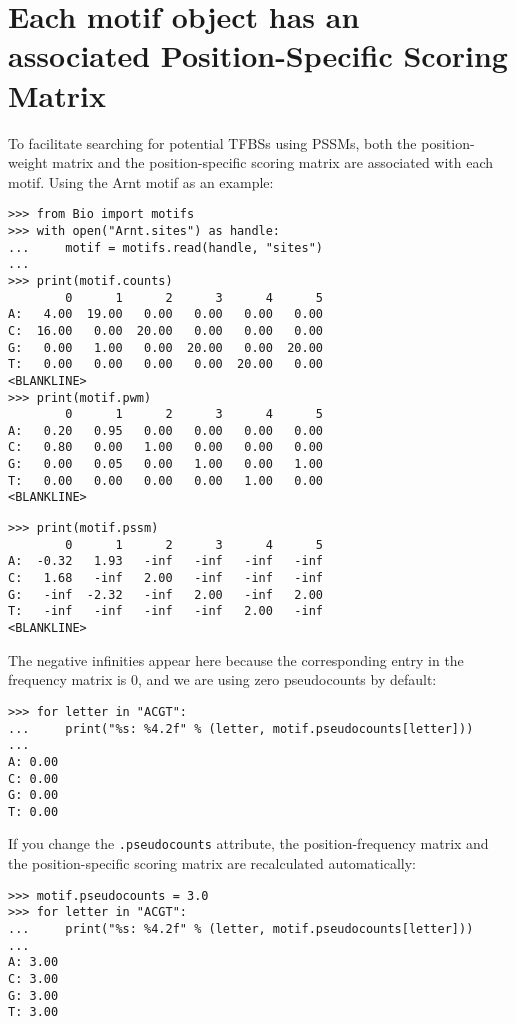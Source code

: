 \section{Each motif object has an associated Position-Specific Scoring Matrix}

To facilitate searching for potential TFBSs using PSSMs, both the position-weight matrix and the position-specific scoring matrix are associated with each motif. Using the Arnt motif as an example:
\begin{verbatim}
>>> from Bio import motifs
>>> with open("Arnt.sites") as handle:
...     motif = motifs.read(handle, "sites")
...
>>> print(motif.counts)
        0      1      2      3      4      5
A:   4.00  19.00   0.00   0.00   0.00   0.00
C:  16.00   0.00  20.00   0.00   0.00   0.00
G:   0.00   1.00   0.00  20.00   0.00  20.00
T:   0.00   0.00   0.00   0.00  20.00   0.00
<BLANKLINE>
>>> print(motif.pwm)
        0      1      2      3      4      5
A:   0.20   0.95   0.00   0.00   0.00   0.00
C:   0.80   0.00   1.00   0.00   0.00   0.00
G:   0.00   0.05   0.00   1.00   0.00   1.00
T:   0.00   0.00   0.00   0.00   1.00   0.00
<BLANKLINE>
\end{verbatim}
\begin{verbatim}
>>> print(motif.pssm)
        0      1      2      3      4      5
A:  -0.32   1.93   -inf   -inf   -inf   -inf
C:   1.68   -inf   2.00   -inf   -inf   -inf
G:   -inf  -2.32   -inf   2.00   -inf   2.00
T:   -inf   -inf   -inf   -inf   2.00   -inf
<BLANKLINE>
\end{verbatim}
The negative infinities appear here because the corresponding entry in the frequency matrix is 0, and we are using zero pseudocounts by default:
\begin{verbatim}
>>> for letter in "ACGT":
...     print("%s: %4.2f" % (letter, motif.pseudocounts[letter]))
...
A: 0.00
C: 0.00
G: 0.00
T: 0.00
\end{verbatim}
If you change the \verb+.pseudocounts+ attribute, the position-frequency matrix and the position-specific scoring matrix are recalculated automatically:
\begin{verbatim}
>>> motif.pseudocounts = 3.0
>>> for letter in "ACGT":
...     print("%s: %4.2f" % (letter, motif.pseudocounts[letter]))
...
A: 3.00
C: 3.00
G: 3.00
T: 3.00
\end{verbatim}
